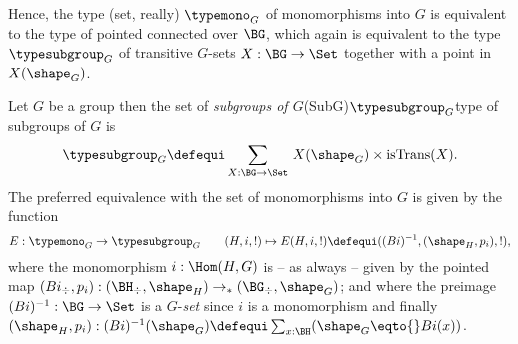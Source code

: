 Hence, the type (set, really) $\typemono_G$ of monomorphisms into $G$ is equivalent to the type of pointed connected \coverings over $\BG$, which again is equivalent to the type $\typesubgroup_G$ of transitive $G$-sets $X:\BG\to\Set$ together with a point in $X(\shape_G)$.

\begin{definition}\label{def:set-of-subgroups}
  Let $G$ be a group then the set of \emph{subgroups of $G$}\glossary(SubG){$\protect{\typesubgroup_G}$}{type of subgroups of $G$} is
  $$\typesubgroup_G\defequi\sum_{X:\BG\to\Set}{\,}X(\shape_G)\times\mathrm{isTrans}(X).$$
  The preferred equivalence
  with the set of monomorphisms into $G$ is given by the function
 $$E:\typemono_G\to\typesubgroup_G\qquad (H,i,!)\mapsto E(H,i,!)\defequi ((Bi)^{-1},(\shape_H,p_i),!),$$
  where the monomorphism $i:\Hom(H,G)$ is -- as always -- given by the pointed map $(Bi_\div,p_i):(\BH_\div,\shape_H)\to_*(\BG_\div,\shape_G)$; and where the preimage $(Bi)^{-1}:\BG\to\Set$ is a $G$-\emph{set} since $i$ is a monomorphism  and finally $(\shape_H,p_i):(Bi)^{-1}(\shape_G)\defequi \sum_{x:\BH}(\shape_G\eqto{}Bi(x))$.
\end{definition}

